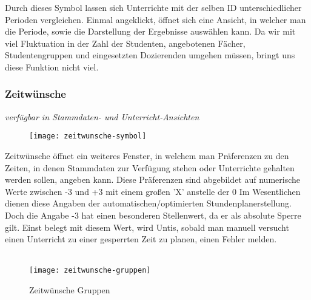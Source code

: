 \noindent
Durch dieses Symbol lassen sich Unterrichte mit der selben ID unterschiedlicher Perioden vergleichen. Einmal angeklickt, öffnet sich eine Ansicht, in welcher man die Periode, sowie die Darstellung der Ergebnisse auswählen kann. Da wir mit viel Fluktuation in der Zahl der Studenten, angebotenen Fächer, Studentengruppen und eingesetzten Dozierenden umgehen müssen, bringt uns diese Funktion nicht viel.\\

\subsubsection{Zeitwünsche}
{\small\textit{verfügbar in Stammdaten- und Unterricht-Ansichten\\}\par}

\begin{wrapfigure}{r}{.05\textwidth}
	\vspace{-50pt}
	\texttt{[image: zeitwunsche-symbol]}
	\vspace{-35pt}
\end{wrapfigure}

\noindent
Zeitwünsche öffnet ein weiteres Fenster, in welchem man Präferenzen zu den Zeiten, in denen Stammdaten zur Verfügung stehen oder Unterrichte gehalten werden sollen, angeben kann. Diese Präferenzen sind abgebildet auf numerische Werte zwischen -3 und +3 mit einem großen 'X' anstelle der 0 Im Wesentlichen dienen diese Angaben der automatischen/optimierten Stundenplanerstellung. Doch die Angabe -3 hat einen besonderen Stellenwert, da er als absolute Sperre gilt. Einst belegt mit diesem Wert, wird Untis, sobald man manuell versucht einen Unterricht zu einer gesperrten Zeit zu planen, einen Fehler melden.\\
\\

\begin{wrapfigure}{r}{0.3\textwidth}
	\texttt{[image: zeitwunsche-gruppen]}
	\vspace{-15pt}
	\caption{Zeitwünsche Gruppen}
	\label{fig:zeitwunsche-gruppen}
\end{wrapfigure}

